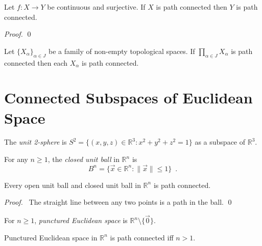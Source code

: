 \begin{prop}
Let $f : X \rightarrow Y$ be continuous and surjective. If $X$ is path
connected then $Y$ is path connected.
\end{prop}

\begin{proof}
\pf
{}
\qed
\end{proof}

\begin{cor}
Let $\{ X_\alpha \}_{\alpha \in J}$ be a family of non-empty topological
spaces. If $\prod_{\alpha \in J} X_\alpha$ is path connected then each
$X_\alpha$ is path connected.
\end{cor}

\section{Connected Subspaces of Euclidean Space}

\begin{df}
  The \emph{unit 2-sphere} is $S^2 = \{ (x, y, z) \in \mathbb{R}^3 : x^2 +
  y^2 + z^2 = 1 \}$ as a subspace of $\mathbb{R}^3$.
\end{df}

\begin{df}
  For any $n \geq 1$, the \emph{closed unit ball} in $\mathbb{R}^n$ is
  \[ B^n = \{ \vec{x} \in \mathbb{R}^n : \| \vec{x} \| \leq 1 \} \enspace . \]
\end{df}

\begin{prop}
  Every open unit ball and closed unit ball in $\mathbb{R}^n$ is path
  connected.
\end{prop}

\begin{proof}
  \pf\ The straight line between any two points is a path in the ball. \qed
\end{proof}

\begin{df}
  For $n \geq 1$, \emph{punctured Euclidean space} is $\mathbb{R}^n \setminus
  \{ \vec{0} \}$.
\end{df}

\begin{prop}
  Punctured Euclidean space in $\mathbb{R}^n$ is path connected iff $n > 1$.
\end{prop}

